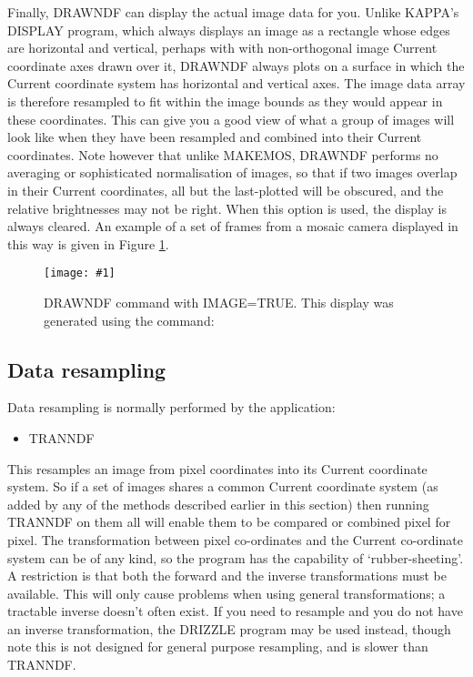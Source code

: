 \documentclass[twoside,11pt]{article}
\newcommand{\htmladdimg}[1]{}
\newcommand{\htmlref}[2]{#1}
\newcommand{\xlabel}[1]{}
\renewcommand{\_}{\texttt{\symbol{95}}}
\newcommand{\routine}[1]{{\sc #1}}
\newcommand{\xroutine}[1]{\htmlref{{\sc #1}}{#1}}
\newcommand{\myfig} [5] {
  \begin{figure}
    \centering\texttt{[image: \#1]}
    \typeout{#1 inserted on page \arabic{page}}
    \caption{\label{#4}#5}
  \end{figure}
  }
\newcommand{\myfig}[5]{
    \htmladdimg{#3}\\
    Figure: \label{#4} #5
    }
\begin{document}
Finally, \routine{DRAWNDF} can display the actual image data for you.
Unlike KAPPA's DISPLAY program, which always displays
an image as a rectangle whose edges are horizontal and vertical, 
perhaps with with non-orthogonal image Current coordinate axes 
drawn over it, \routine{DRAWNDF} always plots on a surface in which the 
Current coordinate system has horizontal and vertical axes.
The image data array is therefore resampled to fit within the
image bounds as they would appear in these coordinates. 
This can give you a good view of what a group of images will 
look like when they have been resampled and combined into their
Current coordinates.  Note however that unlike \xroutine{MAKEMOS},
\routine{DRAWNDF} performs no averaging or sophisticated normalisation of
images, so that if two images overlap in their Current coordinates,
all but the last-plotted will be obscured, and the relative
brightnesses may not be right. 
When this option is used, the display is always cleared.
An example of a set of frames from a mosaic camera displayed 
in this way is given in Figure \ref{OUTIM}.

\myfig{sun139outim.eps}{height=0.5\textheight}{outim.gif}{OUTIM}{DRAWNDF
command with IMAGE=TRUE.  This display was generated using the
command:\protect\\
\hspace*{2em}{\tt drawndf "r10629?" image=yes}}


\subsection{\xlabel{resampling}\label{resampling}Data resampling}

Data resampling is normally performed by the application:
\begin{itemize}
\item \xroutine{TRANNDF}
\end{itemize}
This resamples an image from pixel coordinates into
its Current coordinate system.
So if a set of images shares a common Current coordinate system
(as added by any of the methods described earlier in this section)
then running \routine{TRANNDF} on them all will enable them to
be compared or combined pixel for pixel.
The transformation between pixel co-ordinates and the Current
co-ordinate system can be of any kind,
so the program has the capability of `rubber-sheeting'.
A restriction is that both the forward and the inverse transformations
must be available. This will only cause problems when using general
transformations; a tractable inverse doesn't often exist.
If you need to resample and you do not have an inverse transformation, 
the \xroutine{DRIZZLE} program
may be used instead, though note this is not designed for general
purpose resampling, and is slower than \routine{TRANNDF}.
\end{document}

